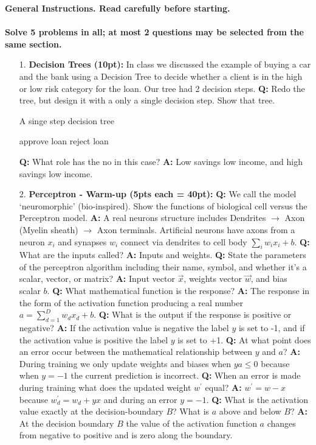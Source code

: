 \documentclass[main.tex]{subfiles}
\begin{document}
\textbf{General Instructions. Read carefully before starting.}\\\\

\textbf{Solve 5 problems in all; at most 2 questions may be selected from the same section.}

\begin{enumerate}

\item[1.] \textbf{Decision Trees (10pt):} In class we discussed the example of buying a car and the bank using a Decision Tree to decide whether a client is in the high or low risk category for the loan. Our tree had 2 decision steps. \textbf{Q:} Redo the tree, but design it with a only a single decision step. Show that tree. 

\begin{algorithm}
\caption{A singe step decision tree}
\begin{algorithmic}[1]
    \State approve loan
\Else
    \State reject loan
\end{algorithmic}
\end{algorithm}

\textbf{Q:} What role has the no in this case? \textbf{A:} Low savings low income, and high savings low income.

\item[2.] \textbf{Perceptron - Warm-up (5pts each = 40pt):} \textbf{Q:} We call the model ‘neuromorphic’ (bio-inspired). Show the functions of biological cell versus the Perceptron model. \textbf{A:} A real neurons structure includes Dendrites $\rightarrow$ Axon (Myelin sheath) $\rightarrow$ Axon terminals. Artificial neurons have axons from a neuron $x_i$ and synapses $w_i$ connect via dendrites to cell body $\sum_{i} w_i x_i +b$. \textbf{Q:} What are the inputs called? \textbf{A:} Inputs and weights. \textbf{Q:} State the parameters of the perceptron algorithm including their name, symbol, and whether it’s a scalar, vector, or matrix? \textbf{A:} Input vector $\vec{x}$, weights vector $\vec{w}$, and bias scalar $b$. \textbf{Q:} What mathematical function is the response? \textbf{A:} The response in the form of the activation function producing a real number $a=\sum_{d=1}^{D} w_d x_d + b$. \textbf{Q:} What is the output if the response is positive or negative? \textbf{A:} If the activation value is negative the label $y$ is set to -1, and if the activation value is positive the label $y$ is set to +1. \textbf{Q:} At what point does an error occur between the mathematical relationship between $y$ and $a$? \textbf{A:} During training we only update weights and biases when $ya \leq 0$ because when $y = -1$  the current prediction is incorrect. \textbf{Q:} When an error is made during training what does the updated weight $w^{\prime}$ equal? \textbf{A:} $w^{\prime} = w - x$ because $w_d^{\prime} = w_d + yx$ and during an error $y=-1$. \textbf{Q:} What is the activation value exactly at the decision-boundary $B$? What is $a$ above and below $B$? \textbf{A:} At the decision boundary $B$ the value of the activation function $a$ changes from negative to positive and is zero along the boundary.    


\end{enumerate}
\end{document}

